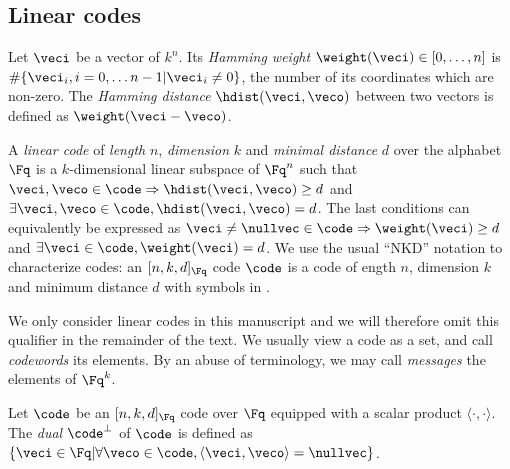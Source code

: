 

\subsection{Linear codes}

\begin{defi}
Let $\veci$ be a vector of $k^n$. Its \emph{Hamming weight} $\weight(\veci) \in [0,\ldots,n]$ is $\#\{\veci_i, i = 0,\ldots n-1| \veci_i \neq 0\}$,
the number of its coordinates which are non-zero.
The \emph{Hamming distance} $\hdist(\veci,\veco)$ between two vectors is defined as $\weight(\veci - \veco)$.
\end{defi}


\begin{defi}
\label{def:lincode}
A \emph{linear code} of \emph{length} $n$, \emph{dimension} $k$ and \emph{minimal distance} $d$ over the alphabet $\Fq$ is a $k$-dimensional linear subspace of $\Fq^n$ such that $\veci, \veco \in \code \Rightarrow \hdist(\veci, \veco) \geq d$
and $\exists \veci, \veco \in \code,  \hdist(\veci, \veco) = d$.
The last conditions can equivalently be expressed as $\veci \neq \nullvec \in \code \Rightarrow \weight(\veci) \geq d$ and $\exists \veci \in \code, \weight(\veci) = d$.
We use the usual ``NKD'' notation to characterize codes: an $[n, k, d]_{\Fq}$ code $\code$ is a code of ength $n$, dimension $k$ and minimum distance $d$
with symbols in \Fq.
\end{defi}

We only consider linear codes in this manuscript and we will therefore omit this qualifier in the remainder of the text. 
We usually view a code as a set, and call \emph{codewords} its elements. By an abuse of terminology, we may call \emph{messages} the elements of $\Fq^k$.

\begin{defi}
Let $\code$ be an $[n, k, d]_{\Fq}$ code over $\Fq$ equipped with a scalar product $\langle\cdot,\cdot\rangle$. The \emph{dual}
$\code^\bot$ of $\code$ is defined as $\{\veci \in \Fq | \forall \veco \in \code, \langle\veci,\veco\rangle = \nullvec\}$.
\end{defi}

